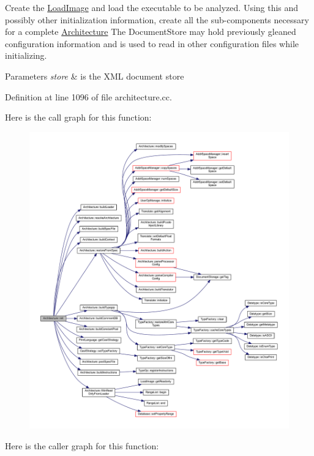 Create the \mbox{\hyperlink{class_load_image}{Load\+Image}} and load the executable to be analyzed. Using this and possibly other initialization information, create all the sub-\/components necessary for a complete \mbox{\hyperlink{class_architecture}{Architecture}} The Document\+Store may hold previously gleaned configuration information and is used to read in other configuration files while initializing. 
\begin{DoxyParams}{Parameters}
{\em store} & is the X\+ML document store \\
\hline
\end{DoxyParams}


Definition at line 1096 of file architecture.\+cc.

Here is the call graph for this function\+:
\nopagebreak
\begin{figure}[H]
\begin{center}
\leavevmode
\includegraphics[width=350pt]{class_architecture_abcf0d020ebe4248b9b35f3a51b78363b_cgraph}
\end{center}
\end{figure}
Here is the caller graph for this function\+:
\nopagebreak

